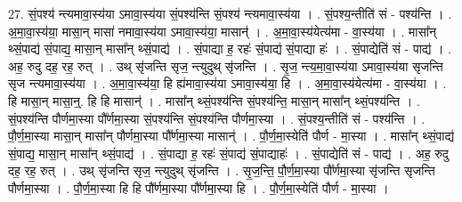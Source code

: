\documentclass[17pt]{extarticle}
\begin{document}
27. सं॒पश्य॑ न्त्यमावा॒स्य॑या ऽमावा॒स्य॑या सं॒पश्य॑न्ति सं॒पश्य॑ न्त्यमावा॒स्य॑या । . सं॒पश्य॒न्तीति॑ सं - पश्य॑न्ति । . अ॒मा॒वा॒स्य॑या॒ मासा॒न् मासा॑ नमावा॒स्य॑या ऽमावा॒स्य॑या॒ मासान्॑ । . अ॒मा॒वा॒स्य॑येत्य॑मा - वा॒स्य॑या । . मासा᳚न् थ्सं॒पाद्य॑ सं॒पाद्य॒ मासा॒न् मासा᳚न् थ्सं॒पाद्य॑ । . सं॒पाद्या ह॒ रहः॑ सं॒पाद्य॑ सं॒पाद्या हः॑ । . सं॒पाद्येति॑ सं - पाद्य॑ । . अह॒ रुदु दह॒ रह॒ रुत् । . उथ् सृ॑जन्ति सृज॒ न्त्युदुथ् सृ॑जन्ति । . सृ॒ज॒ न्त्य॒मा॒वा॒स्य॑या ऽमावा॒स्य॑या सृजन्ति सृज न्त्यमावा॒स्य॑या । . अ॒मा॒वा॒स्य॑या॒ हि ह्य॑मावा॒स्य॑या ऽमावा॒स्य॑या॒ हि । . अ॒मा॒वा॒स्य॑येत्य॑मा - वा॒स्य॑या । . हि मासा॒न् मासा॒न्॒. हि हि मासान्॑ । . मासा᳚न् थ्सं॒पश्य॑न्ति सं॒पश्य॑न्ति॒ मासा॒न् मासा᳚न् थ्सं॒पश्य॑न्ति । . सं॒पश्य॑न्ति पौर्णमा॒स्या पौ᳚र्णमा॒स्या सं॒पश्य॑न्ति सं॒पश्य॑न्ति पौर्णमा॒स्या । . सं॒पश्य॒न्तीति॑ सं - पश्य॑न्ति । . पौ॒र्ण॒मा॒स्या मासा॒न् मासा᳚न् पौर्णमा॒स्या पौ᳚र्णमा॒स्या मासान्॑ । . पौ॒र्ण॒मा॒स्येति॑ पौर्ण - मा॒स्या । . मासा᳚न् थ्सं॒पाद्य॑ सं॒पाद्य॒ मासा॒न् मासा᳚न् थ्सं॒पाद्य॑ । . सं॒पाद्या ह॒ रहः॑ सं॒पाद्य॑ सं॒पाद्याहः॑ । . सं॒पाद्येति॑ सं - पाद्य॑ । . अह॒ रुदु दह॒ रह॒ रुत् । . उथ् सृ॑जन्ति सृज॒ न्त्युदुथ् सृ॑जन्ति । . सृ॒ज॒न्ति॒ पौ॒र्ण॒मा॒स्या पौ᳚र्णमा॒स्या सृ॑जन्ति सृजन्ति पौर्णमा॒स्या । . पौ॒र्ण॒मा॒स्या हि हि पौ᳚र्णमा॒स्या पौ᳚र्णमा॒स्या हि । . पौ॒र्ण॒मा॒स्येति॑ पौर्ण - मा॒स्या । \newline
\end{document}

